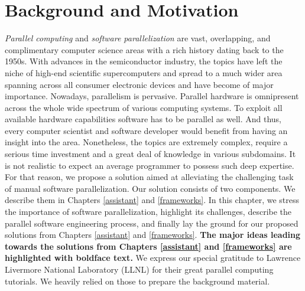 \chapter{Background and Motivation}
\label{background}
\quad \textit{Parallel computing} and \textit{software parallelization} are vast, overlapping, and complimentary computer science areas with a rich history dating back to the 1950s. With advances in the semiconductor industry, the topics have left the niche of high-end scientific supercomputers and spread to a much wider area spanning across all consumer electronic devices and have become of major importance.\newline\null
\quad Nowadays, parallelism is pervasive. Parallel hardware is omnipresent across the whole wide spectrum of various computing systems. To exploit all available hardware capabilities software has to be parallel as well. And thus, every computer scientist and software developer would benefit from having an insight into the area. Nonetheless, the topics are extremely complex, require a serious time investment and a great deal of knowledge in various subdomains. It is not realistic to expect an average programmer to possess such deep expertise. For that reason, we propose a solution aimed at alleviating the challenging task of manual software parallelization. Our solution consists of two components. We describe them in Chapters \ref{assistant} and \ref{frameworks}.\newline\null
\quad In this chapter, we stress the importance of software parallelization, highlight its challenges, describe the parallel software engineering process, and finally lay the ground for our proposed solutions from Chapters \ref{assistant} and \ref{frameworks}. \textbf{The major ideas leading towards the solutions from Chapters \ref{assistant} and \ref{frameworks} are highlighted with boldface text.} We express our special gratitude to Lawrence Livermore National Laboratory (LLNL) \cite{llnl_computing} for their great parallel computing tutorials. We heavily relied on those to prepare the background material.\newline\null
%
